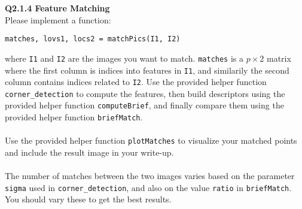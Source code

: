 \documentclass[12pt,letterpaper, onecolumn]{exam}
\begin{document}
\begin{questions}
    \pagebreak

    \question \textbf{Q2.1.4 Feature Matching}\\
    Please implement a function:

    \begin{center}
    \texttt{matches, lovs1, locs2 = matchPics(I1, I2)}
    \end{center}
    
    where \texttt{I1} and \texttt{I2} are the images you want to match. \texttt{matches} is a $p \times 2$ matrix where the first column is indices into features in \texttt{I1}, and similarily the second column contains indices related to \texttt{I2}. Use the provided helper function \texttt{corner\_detection} to compute the features, then build descriptors using the provided helper function \texttt{computeBrief}, and finally compare them using the provided helper function \texttt{briefMatch}.\\ \\
    Use the provided helper function \texttt{plotMatches} to visualize your matched points and include the result image in your write-up.\\ \\
    The number of matches between the two images varies based on the parameter \texttt{sigma} used in \texttt{corner\_detection}, and also on the value \texttt{ratio} in \texttt{briefMatch}. You should vary these to get the best results.


\end{questions}
\end{document}
